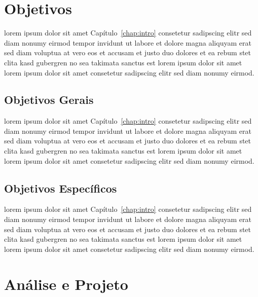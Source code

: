 \chapter{\label{chap:objetivos}Objetivos}

lorem ipsum dolor sit amet Capítulo~\ref{chap:intro} consetetur
sadipscing elitr sed diam nonumy eirmod tempor invidunt ut labore
et dolore magna aliquyam erat sed diam voluptua at vero eos et
accusam et justo duo dolores et ea rebum stet clita kasd gubergren
no sea takimata sanctus est lorem ipsum dolor sit amet lorem ipsum
dolor sit amet consetetur sadipscing elitr sed diam nonumy eirmod.

\section{\label{sec:gerais}Objetivos Gerais}

lorem ipsum dolor sit amet Capítulo~\ref{chap:intro} consetetur
sadipscing elitr sed diam nonumy eirmod tempor invidunt ut labore
et dolore magna aliquyam erat sed diam voluptua at vero eos et
accusam et justo duo dolores et ea rebum stet clita kasd gubergren
no sea takimata sanctus est lorem ipsum dolor sit amet lorem ipsum
dolor sit amet consetetur sadipscing elitr sed diam nonumy eirmod.

\section{\label{sec:espec}Objetivos Específicos}

lorem ipsum dolor sit amet Capítulo~\ref{chap:intro} consetetur
sadipscing elitr sed diam nonumy eirmod tempor invidunt ut labore
et dolore magna aliquyam erat sed diam voluptua at vero eos et
accusam et justo duo dolores et ea rebum stet clita kasd gubergren
no sea takimata sanctus est lorem ipsum dolor sit amet lorem ipsum
dolor sit amet consetetur sadipscing elitr sed diam nonumy eirmod.




\chapter{\label{chap:ana&proj}Análise e Projeto}

